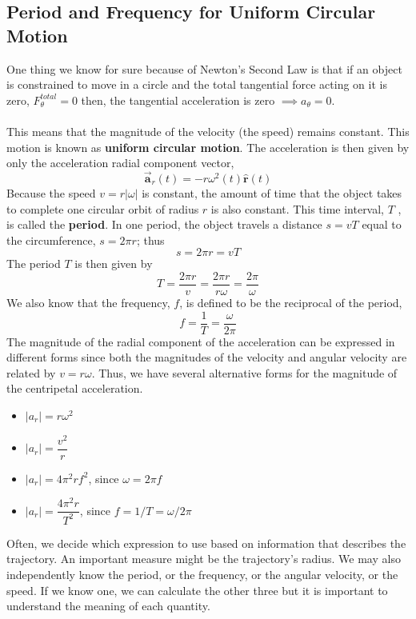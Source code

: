 \documentclass[12pt,addpoints]{exam}
\begin{document}
	\subsection*{Period and Frequency for Uniform Circular Motion}
	One thing we know for sure because of Newton's Second Law is that if an object is constrained to move in a circle and the total tangential force acting on it is zero,  $F^{total}_\theta=0$ then, the tangential acceleration is zero $\implies a_{\theta}=0$. \\ \\
	This means that the magnitude of the velocity (the speed) remains constant. This motion is known as \textbf{uniform circular motion}. The acceleration is then given by only the acceleration radial component vector,
	$$\overrightarrow{\mathbf{a}}_{r}(t)=-r \omega^{2}(t) \hat{\mathbf{r}}(t)$$
	Because the speed $v=r|\omega|$ is constant, the amount of time that the object takes to complete one circular orbit of radius $r$ is also constant. This time interval, $T$ , is called the \textbf{period}. In one period, the object travels a distance $s = vT$ equal to the circumference, $s=2\pi r$; thus
	$$s=2 \pi r=v T$$
	The period $T$ is then given by
	$$T=\frac{2 \pi r}{v}=\frac{2 \pi r}{r \omega}=\frac{2 \pi}{\omega}$$
	We also know that the frequency, $f$, is defined to be the reciprocal of the period,
	$$f=\frac{1}{T}=\frac{\omega}{2 \pi} $$
	The magnitude of the radial component of the acceleration can be expressed in different forms since both the magnitudes of the velocity and angular velocity are related by $v = r\omega$. Thus, we have several alternative forms for the magnitude of the centripetal acceleration. 
	\begin{itemize}
		\item $\left|a_{r}\right|=r \omega^{2}$
		\item $\left|a_{r}\right|=\dfrac{v^{2}}{r}$
		\item $\left|a_{r}\right|=4 \pi^{2} r f^{2}$, since $\omega=2\pi f$
		\item $\left|a_{r}\right|=\dfrac{4 \pi^{2} r}{T^{2}}$, since $f=1 / T=\omega / 2 \pi$
	\end{itemize}
	Often, we decide which expression to use based on information that describes the trajectory. An important measure might be the trajectory’s radius. We may also independently know the period, or the frequency, or the angular velocity, or the speed. If we know one, we can calculate the other three but it is important to understand the meaning of each quantity.
	
	
	
\end{document}
